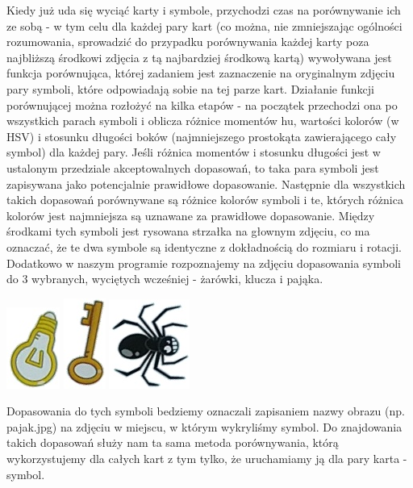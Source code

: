 \documentclass[10pt,a4paper]{article}
\begin{document}
Kiedy już uda się wyciąć karty i symbole, przychodzi czas na porównywanie ich ze sobą - w tym celu dla każdej pary kart (co można, nie zmniejszając ogólności rozumowania, sprowadzić do przypadku porównywania każdej karty poza najbliższą środkowi zdjęcia z tą najbardziej środkową kartą) wywoływana jest funkcja porównująca, której zadaniem jest zaznaczenie na oryginalnym zdjęciu pary symboli, które odpowiadają sobie na tej parze kart. 
Działanie funkcji porównującej można rozłożyć na kilka etapów - na początek przechodzi ona po wszystkich parach symboli i oblicza różnice momentów hu, wartości kolorów (w HSV) i stosunku długości boków (najmniejszego prostokąta zawierającego cały symbol) dla każdej pary. Jeśli różnica momentów i stosunku długości jest w ustalonym przedziale akceptowalnych dopasowań, to taka para symboli jest zapisywana jako potencjalnie prawidłowe dopasowanie. Następnie dla wszystkich takich dopasowań porównywane są różnice kolorów symboli i te, których różnica kolorów jest najmniejsza są uznawane za prawidłowe dopasowanie. Między środkami tych symboli jest rysowana strzałka na głownym zdjęciu, co ma oznaczać, że te dwa symbole są identyczne z dokładnością do rozmiaru i rotacji.\\

Dodatkowo w naszym programie rozpoznajemy na zdjęciu dopasowania symboli do 3 wybranych, wyciętych wcześniej - żarówki, klucza i pająka.
\begin{center}
\includegraphics[scale=0.4]{zarowka.jpg}
\includegraphics[scale=0.4]{klucz.jpg}
\includegraphics[scale=0.4]{pajak.jpg}
\end{center}
Dopasowania do tych symboli bedziemy oznaczali zapisaniem nazwy obrazu (np. pajak.jpg) na zdjęciu w miejscu, w którym wykryliśmy symbol. Do znajdowania takich dopasowań służy nam ta sama metoda porównywania, którą wykorzystujemy dla całych kart z tym tylko, że uruchamiamy ją dla pary karta - symbol.
\end{document}
